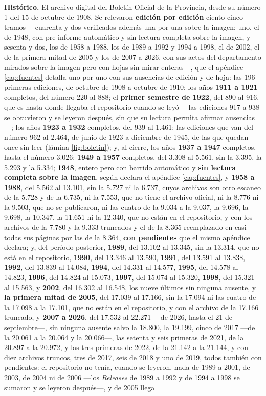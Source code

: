 \textbf{Histórico.} El archivo digital del Boletín Oficial de la Provincia, desde su número 1 del 15 de octubre de 1908. Se relevaron \textbf{edición por edición} ciento cinco tramos ---cuarenta y dos verificados además una por una sobre la imagen; uno, el de 1948, con pre-informe automático y sin lectura completa sobre la imagen, y sesenta y dos, los de 1958 a 1988, los de 1989 a 1992 y 1994 a 1998, el de 2002, el de la primera mitad de 2005 y los de 2007 a 2026, con sus actos del departamento mirados sobre la imagen pero con hojas sin mirar enteras---, que el apéndice \ref{cap:fuentes} detalla uno por uno con sus ausencias de edición y de hoja: las 196 primeras ediciones, de octubre de 1908 a octubre de 1910; los años \textbf{1911 a 1921} completos, del número 220 al 888; el \textbf{primer semestre de 1922}, del 890 al 916, que es hasta donde llegaba el repositorio cuando se leyó ---las ediciones 917 a 938 se obtuvieron y se leyeron después, sin que su lectura permita afirmar ausencias---; los años \textbf{1923 a 1932} completos, del 939 al 1.461; las ediciones que van del número 962 al 2.464, de junio de 1923 a diciembre de 1945, de las que quedan once sin leer (lámina \ref{fig:boletin}); y, al cierre, los años \textbf{1937 a 1947} completos, hasta el número 3.026; \textbf{1949 a 1957} completos, del 3.308 al 5.561, sin la 3.395, la 5.293 y la 5.334; \textbf{1948}, entero pero con barrido automático y \textbf{sin lectura completa sobre la imagen}, según declara el apéndice \ref{cap:fuentes}, y \textbf{1958 a 1988}, del 5.562 al 13.101, sin la 5.727 ni la 6.737, cuyos archivos son otro escaneo de la 5.728 y de la 6.735, ni la 7.553, que no tiene el archivo oficial, ni la 8.776 ni la 9.503, que no se publicaron, ni las cuatro de la 9.034 a la 9.037, la 9.696, la 9.698, la 10.347, la 11.651 ni la 12.340, que no están en el repositorio, y con los archivos de la 7.780 y la 9.333 truncados y el de la 8.365 reemplazado en casi todas sus páginas por las de la 8.364, \textbf{con pendientes} que el mismo apéndice declara; y, del período posterior, \textbf{1989}, del 13.102 al 13.345, sin la 13.314, que no está en el repositorio, \textbf{1990}, del 13.346 al 13.590, \textbf{1991}, del 13.591 al 13.838, \textbf{1992}, del 13.839 al 14.084, \textbf{1994}, del 14.331 al 14.577, \textbf{1995}, del 14.578 al 14.823, \textbf{1996}, del 14.824 al 15.073, \textbf{1997}, del 15.074 al 15.320, \textbf{1998}, del 15.321 al 15.563, y \textbf{2002}, del 16.302 al 16.548, los nueve últimos sin ninguna ausente, y \textbf{la primera mitad de 2005}, del 17.039 al 17.166, sin la 17.094 ni las cuatro de la 17.098 a la 17.101, que no están en el repositorio, y con el archivo de la 17.166 truncado, y \textbf{2007 a 2026}, del 17.532 al 22.271 ---de 2026, hasta el 21 de septiembre---, sin ninguna ausente salvo la 18.800, la 19.199, cinco de 2017 ---de la 20.061 a la 20.064 y la 20.066---, las setenta y seis primeras de 2021, de la 20.897 a la 20.972, y las tres primeras de 2022, de la 21.142 a la 21.144, y con diez archivos truncos, tres de 2017, seis de 2018 y uno de 2019, todos también con pendientes: el repositorio no tenía, cuando se leyeron, nada de 1989 a 2001, de 2003, de 2004 ni de 2006 ---los \textit{Releases} de 1989 a 1992 y de 1994 a 1998 se sumaron y se leyeron después---, y de 2005 llega 